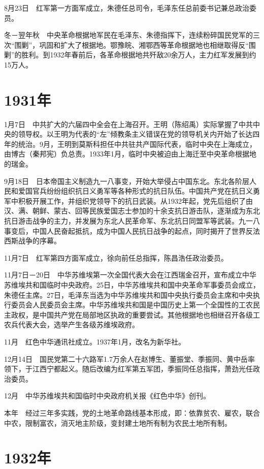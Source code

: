 \documentclass[10pt,a4paper,twocolumn]{book}
\begin{document}
8月23日　红军第一方面军成立，朱德任总司令，毛泽东任总前委书记兼总政治委员。

冬－翌年秋　中央革命根据地军民在毛泽东、朱德指挥下，连续粉碎国民党军的三次“围剿”，巩固和扩大了根据地。鄂豫皖、湘鄂西等革命根据地也相继取得反“围剿”的胜利。到1932年春前后，各革命根据地共歼敌20余万人，主力红军发展到约15万人。

\section{1931年}

1月7日　中共扩大的六届四中全会在上海召开。王明（陈绍禹）实际掌握了中共中央的领导权。以王明为代表的“左”倾教条主义错误在党的领导机关内开始了长达四年的统治。9月，王明到莫斯科担任中共驻共产国际代表，临时中央在上海成立，由博古（秦邦宪）负总责。1933年1月，临时中央被迫由上海迁至中央革命根据地的瑞金。

9月18日　日本帝国主义制造九一八事变，开始大举侵占中国东北。东北各阶层人民和爱国官兵纷纷组织抗日义勇军等各种形式的抗日队伍。中国共产党在抗日义勇军中积极开展工作，并组织党领导下的抗日武装。从1932年起，党先后组织了由汉、满、朝鲜、蒙古、回等民族爱国志士参加的十余支抗日游击队，逐渐成为东北抗日游击战争的主力，并发展为东北人民革命军、东北抗日同盟军等武装。九一八事变后，中国人民奋起抵抗，成为中国人民抗日战争的起点，同时揭开了世界反法西斯战争的序幕。

11月7日　红军第四方面军成立，徐向前任总指挥，陈昌浩任政治委员。

11月7日－20日　中华苏维埃第一次全国代表大会在江西瑞金召开，宣布成立中华苏维埃共和国临时中央政府。25日，中华苏维埃共和国中央革命军事委员会成立，朱德任主席。27日，毛泽东当选为中华苏维埃共和国中央执行委员会主席和中央执行委员会人民委员会主席。中华苏维埃共和国是中国历史上第一个全国性的工农民主政权，是中国共产党在局部地区执政的重要尝试。其他根据地也相继召开各级工农兵代表大会，选举产生各级苏维埃政府。

11月　红色中华通讯社成立。1937年1月，改名为新华社。

12月14日　国民党第二十六路军1.7万余人在赵博生、董振堂、季振同、黄中岳率领下，于江西宁都起义。随后改编为红军第五军团，季振同任总指挥，萧劲光任政治委员。

12月　中华苏维埃共和国临时中央政府机关报《红色中华》创刊。

本年　经过三年多实践，党的土地革命路线基本形成，即：依靠贫农、雇农，联合中农，限制富农，消灭地主阶级，变封建土地所有制为农民土地所有制。

\section{1932年}
\end{document}
